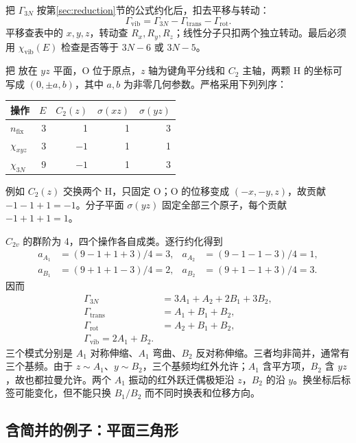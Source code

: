 把 $\Gamma_{3N}$ 按第\ref{sec:reduction}节的公式约化后，扣去平移与转动：
\[
\Gamma_{\mathrm{vib}}=\Gamma_{3N}-\Gamma_{\mathrm{trans}}-\Gamma_{\mathrm{rot}}.
\]
平移查表中的 $x,y,z$，转动查 $R_x,R_y,R_z$；线性分子只扣两个独立转动。最后必须用 $\chi_{\mathrm{vib}}(E)$ 检查是否等于 $3N-6$ 或 $3N-5$。

\begin{worked}[水：从九个位移到三个振动]
把  放在 $yz$ 平面，O 位于原点，$z$ 轴为键角平分线和 $C_2$ 主轴，两颗 H 的坐标可写成 $(0,\pm a,b)$，其中 $a,b$ 为非零几何参数。严格采用下列列序：
\begin{center}
\small
\begin{tabular}{lrrrr}
\toprule
操作 & $E$ & $C_2(z)$ & $\sigma(xz)$ & $\sigma(yz)$\\
\midrule
$n_{\mathrm{fix}}$ & 3 & 1 & 1 & 3\\
$\chi_{xyz}$ & 3 & $-1$ & 1 & 1\\
$\chi_{3N}$ & 9 & $-1$ & 1 & 3\\
\bottomrule
\end{tabular}
\end{center}
例如 $C_2(z)$ 交换两个 H，只固定 O；O 的位移变成 $(-x,-y,z)$，故贡献 $-1-1+1=-1$。分子平面 $\sigma(yz)$ 固定全部三个原子，每个贡献 $-1+1+1=1$。

$C_{2v}$ 的群阶为 4，四个操作各自成类。逐行约化得到
\begin{align*}
a_{A_1}&=(9-1+1+3)/4=3, & a_{A_2}&=(9-1-1-3)/4=1,\\
a_{B_1}&=(9+1+1-3)/4=2, & a_{B_2}&=(9+1-1+3)/4=3.
\end{align*}
因而
\begin{align*}
\Gamma_{3N}&=3A_1+A_2+2B_1+3B_2,\\
\Gamma_{\mathrm{trans}}&=A_1+B_1+B_2,\\
\Gamma_{\mathrm{rot}}&=A_2+B_1+B_2,\\
\boxed{\Gamma_{\mathrm{vib}}=2A_1+B_2}.&
\end{align*}
三个模式分别是 $A_1$ 对称伸缩、$A_1$ 弯曲、$B_2$ 反对称伸缩。三者均非简并，通常有三个基频。由于 $z\sim A_1$、$y\sim B_2$，三个基频均红外允许；$A_1$ 含平方项，$B_2$ 含 $yz$，故也都拉曼允许。两个 $A_1$ 振动的红外跃迁偶极矩沿 $z$，$B_2$ 的沿 $y$。换坐标后标签可能变化，但不能只换 $B_1/B_2$ 而不同时换表和位移方向。
\end{worked}

\subsection{含简并的例子：平面三角形 }

